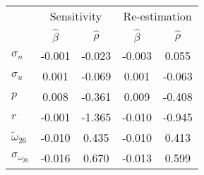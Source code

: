 \begin{tabular}{l*{4}{c}} \toprule 
& \multicolumn{2}{c}{Sensitivity} & \multicolumn{2}{c}{Re-estimation} \\ \cmidrule(lr){2-3} \cmidrule(lr){4-5}  
& $\hat{\beta}$ & $\hat{\rho}$ & $\hat{\beta}$ & $\hat{\rho}$ \\ \cmidrule(lr){2-5} 
  $\sigma_{n}$ & -0.001 & -0.023 & -0.003 & 0.055 \\ 
  $\sigma_{u}$ & 0.001 & -0.069 & 0.001 & -0.063 \\ 
  $p$ & 0.008 & -0.361 & 0.009 & -0.408 \\ 
  $r$ & -0.001 & -1.365 & -0.010 & -0.945 \\ 
  $\tilde{\omega}_{26}$ & -0.010 & 0.435 & -0.010 & 0.413 \\ 
  $\sigma_{\omega_{26}}$ & -0.016 & 0.670 & -0.013 & 0.599 \\ 
 \bottomrule 
 \end{tabular}